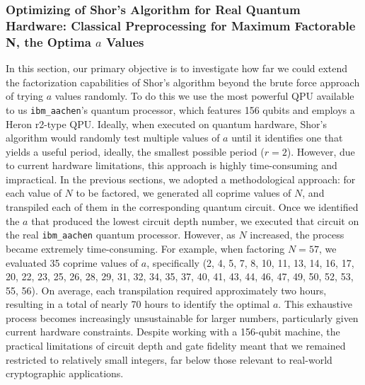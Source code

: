 \documentclass[conference,twoside]{IEEEtran}
\begin{document}
\subsubsection{Optimizing of Shor’s Algorithm for Real Quantum Hardware: Classical Preprocessing for Maximum Factorable N, the Optima $a$ Values}

In this section, our primary objective is to investigate how far we could extend the factorization capabilities of Shor’s algorithm beyond the brute force approach of trying $a$ values randomly. To do this we use the most powerful QPU available to us \texttt{ibm\_aachen}'s quantum processor, which features 156 qubits and employs a Heron r2-type QPU. 
Ideally, when executed on quantum hardware, Shor’s algorithm would randomly test multiple values of $a$ until it identifies one that yields a useful period, ideally, the smallest possible period ($r=2$). However, due to current hardware limitations, this approach is highly time-consuming and impractical.
In the previous sections, we adopted a methodological approach: for each value of $N$ to be factored, we generated all coprime values of $N$, and transpiled each of them in the corresponding quantum circuit. Once we identified the $a$ that produced the lowest circuit depth number, we executed that circuit on the real \texttt{ibm\_aachen} quantum processor.
However, as $N$ increased, the process became extremely time-consuming. For example, when factoring $N=57$, we evaluated 35 coprime values of $a$, specifically (2, 4, 5, 7, 8, 10, 11, 13, 14, 16, 17, 20, 22, 23, 25, 26, 28, 29, 31, 32, 34, 35, 37, 40, 41, 43, 44, 46, 47, 49, 50, 52, 53, 55, 56). On average, each transpilation required approximately two hours, resulting in a total of nearly 70 hours to identify the optimal $a$.
This exhaustive process becomes increasingly unsustainable for larger numbers, particularly given current hardware constraints. Despite working with a 156-qubit machine, the practical limitations of circuit depth and gate fidelity meant that we remained restricted to relatively small integers, far below those relevant to real-world cryptographic applications.
\end{document}
